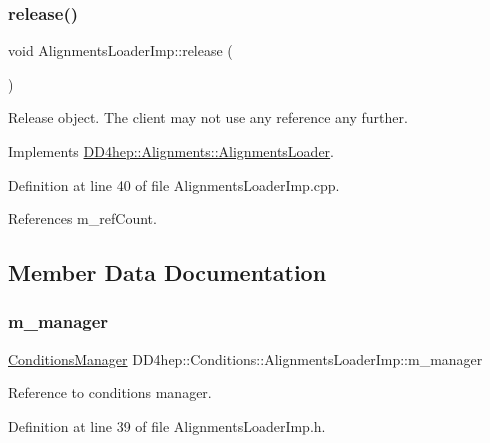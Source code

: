 \subsubsection{\texorpdfstring{release()}{release()}}
{\footnotesize\ttfamily void Alignments\+Loader\+Imp\+::release (\begin{DoxyParamCaption}{ }\end{DoxyParamCaption})\hspace{0.3cm}{\ttfamily [virtual]}}



Release object. The client may not use any reference any further. 



Implements \hyperlink{class_d_d4hep_1_1_alignments_1_1_alignments_loader_acebda57b7dc5288116e7162dda92b65e}{D\+D4hep\+::\+Alignments\+::\+Alignments\+Loader}.



Definition at line 40 of file Alignments\+Loader\+Imp.\+cpp.



References m\+\_\+ref\+Count.



\subsection{Member Data Documentation}
\hypertarget{class_d_d4hep_1_1_conditions_1_1_alignments_loader_imp_a448202e08fc26fb95d13fd86993b3685}{}\label{class_d_d4hep_1_1_conditions_1_1_alignments_loader_imp_a448202e08fc26fb95d13fd86993b3685} 
\subsubsection{\texorpdfstring{m\+\_\+manager}{m\_manager}}
{\footnotesize\ttfamily \hyperlink{class_d_d4hep_1_1_conditions_1_1_conditions_manager}{Conditions\+Manager} D\+D4hep\+::\+Conditions\+::\+Alignments\+Loader\+Imp\+::m\+\_\+manager\hspace{0.3cm}{\ttfamily [protected]}}



Reference to conditions manager. 



Definition at line 39 of file Alignments\+Loader\+Imp.\+h.




